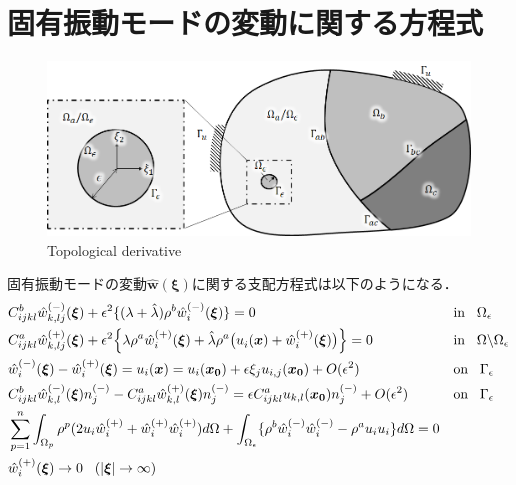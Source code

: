 \section{固有振動モードの変動に関する方程式}

\begin{figure}[ht]
	\begin{center}
		\includegraphics[width=13cm]{./figures/TD.png}
		\caption{Topological derivative}
		\label{fig:TD}
	\end{center}
\end{figure}

固有振動モードの変動$\hat{\bm{w}}(\bm{\xi})$に関する支配方程式は以下のようになる．
\begin{align}
&C_{ijkl}^{b} \hat{w}^{(-)}_{k,lj}(\bm{\xi})
+\epsilon^2\{(\lambda+\hat{\lambda})\rho^{b} \hat{w}_{i}^{(-)}(\bm{\xi})\}=0&&\text{in}\hspace{0.3cm}\Omega_{\epsilon}
\label{eq:GovDisturIn}
\\
&C_{ijkl}^{a}\hat{w}^{(+)}_{k,lj}(\bm{\xi})
+\epsilon^2\Bigl \{\lambda\rho^{a} \hat{w}_{i}^{(+)}(\bm{\xi})
+\hat{\lambda}\rho^{a} \bigl(u_{i}^{}(\bm{x})+\hat{w}_{i}^{(+)}(\bm{\xi}) \bigr) \Bigr \}=0
&&\text{in}\hspace{0.3cm}\Omega\backslash\Omega_{\epsilon}
\label{eq:GovDisturOut}
\\
&\hat{w}_{i}^{(-)}(\bm{\xi})-\hat{w}_{i}^{(+)}(\bm{\xi})=u_{i}(\bm{x})=u_{i}(\bm{x_0})+\epsilon \xi_j u_{i,j}(\bm{x_0})+O(\epsilon^2)
&&\text{on}\hspace{0.3cm}\Gamma_{\epsilon}
\label{eq:GovDisturUBC}
\\
&C_{ijkl}^{b}\hat{w}_{k,l}^{(-)}(\bm{\xi})n_{j}^{(-)}
-C_{ijkl}^{a}\hat{w}_{k,l}^{(+)}(\bm{\xi})n_{j}^{(-)}
=\epsilon C_{ijkl}^{a}u_{k,l}(\bm{x_0})n_{j}^{(-)}+O(\epsilon^2)
&&\text{on}\hspace{0.3cm}\Gamma_{\epsilon}
\label{eq:GovDisturSBC}
\\
&\sum_{p=1}^{n}\int_{\Omega_p}\rho^{p}(2u_{i}\hat{w}_{i}^{(+)}+\hat{w}_{i}^{(+)}\hat{w}_{i}^{(+)}) d\Omega
+\int_{\Omega_{\epsilon}}\{\rho^{b}\hat{w}_{i}^{(-)}\hat{w}_{i}^{(-)}-\rho^{a}u_{i}u_{i}\} d\Omega=0
\label{eq:GovDisturNorm}
\\
&\hat{w}_{i}^{(+)}(\bm{\xi})\rightarrow 0 \hspace{0.3cm} (|\bm{\xi}|\rightarrow \infty)
\label{eq:GovDisturInftyBC}
\end{align}

